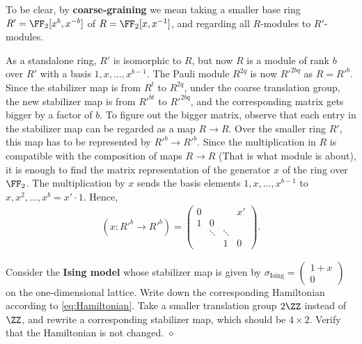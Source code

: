 To be clear, by {\bf coarse-graining}
we mean taking a smaller base ring 
$R' = \FF_2[x^b,x^{-b}]$ of $R = \FF_2[x, x^{-1}]$,
and regarding all $R$-modules to $R'$-modules.

As a standalone ring, $R'$ is isomorphic to $R$,
but now $R$ is a module of rank $b$ over $R'$ with a basis $1,x,\ldots, x^{b-1}$.
The Pauli module $R^{2q}$ is now $R'^{2bq}$ as $R = R'^{b}$.
Since the stabilizer map is from $R^t$ to $R^{2q}$,
under the coarse translation group, 
the new stabilizer map is from $R'^{bt}$ to $R'^{2bq}$,
and the corresponding matrix gets bigger by a factor of $b$.
To figure out the bigger matrix,
observe that each entry in the stabilizer map can be regarded as a map $R \to R$.
Over the smaller ring $R'$, this map has to be represented by $R'^b \to R'^b$.
Since the multiplication in $R$ is compatible with the composition of maps $R \to R$
(That is what module is about),
it is enough to find the matrix representation of the generator $x$ of the ring over $\FF_2$.
The multiplication by $x$ sends the basis elements $1,x,\ldots, x^{b-1}$ to $x, x^2, \ldots, x^b = x' \cdot 1$.
Hence,
\begin{align}
 (x : R'^b \to R'^b) = 
 \begin{pmatrix}
  0 &   & & x' \\
  1 & 0 & &    \\
    & \ddots & \ddots & \\
   & & 1 & 0
 \end{pmatrix} .
\end{align}

\begin{exc}
Consider the {\bf Ising model}
whose stabilizer map is given by 
$\sigma_\text{Ising} = \begin{pmatrix} 1+x \\ 0 \end{pmatrix}$
on the one-dimensional lattice.
Write down the corresponding Hamiltonian according to \eqref{eq:Hamiltonian}.
Take a smaller translation group $2\ZZ$ instead of $\ZZ$,
and rewrite a corresponding stabilizer map, which should be $4 \times 2$.
Verify that the Hamiltonian is not changed.
\label{IsingModel}
\hfill $\diamond$ \end{exc}

